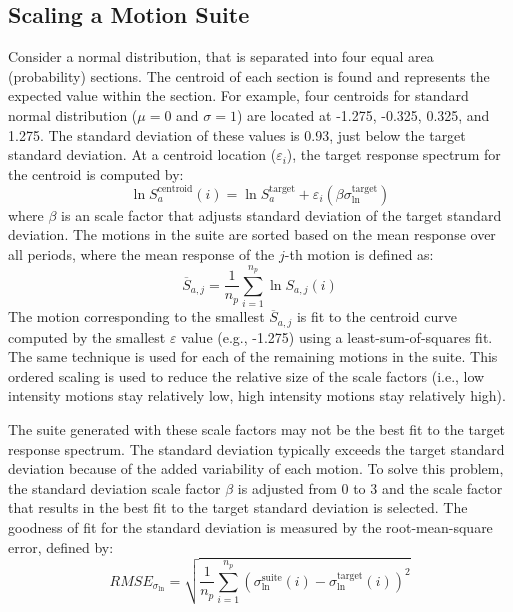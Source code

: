 \documentclass[11pt]{article}
\begin{document}
\subsection{Scaling a Motion Suite}
Consider a normal distribution, that is separated into four equal area
(probability) sections. The centroid of each section is found and represents the
expected value within the section. For example, four centroids for standard
normal distribution ($\mu=0$ and $\sigma=1$) are located at -1.275, -0.325,
0.325, and 1.275. The standard deviation of these values is 0.93, just below the
target standard deviation. At a centroid location ($\varepsilon_i$), the target
response spectrum for the centroid is computed by:
\begin{displaymath}
	\ln S_a^\text{centroid}(i) = \ln S_a^\text{target} + \varepsilon_i \left( \beta
	\sigma_{\ln}^{\text{target}} \right)
\end{displaymath}
where $\beta$ is an scale factor that adjusts standard deviation of the target
standard deviation.  The motions in the suite are sorted based on the mean
response over all periods, where the mean response of the $j$-th motion is
defined as:
\begin{displaymath}
  \overline{S}_{a,j} = \frac{1}{n_p} \sum_{i=1}^{n_p} \ln S_{a,j}(i)
\end{displaymath}
The motion corresponding to the smallest $\overline{S}_{a,j}$ is 
fit to the centroid curve computed by the smallest $\varepsilon$
value (e.g., -1.275) using a least-sum-of-squares fit. The same technique is
used for each of the remaining motions in the suite. This ordered scaling is
used to reduce the relative size of the scale factors (i.e., low intensity
motions stay relatively low, high intensity motions stay relatively high).

The suite generated with these scale factors may not be the best fit to the
target response spectrum. The standard deviation typically exceeds the target
standard deviation because of the added variability of each motion. To solve
this problem, the standard deviation scale factor $\beta$ is adjusted from 0 to
3 and the scale factor that results in the best fit to the target standard
deviation is selected. The goodness of fit for the standard deviation is
measured by the root-mean-square error, defined by:
\begin{displaymath}
	RMSE_{\sigma_{\ln}} = \sqrt{\frac{1}{n_p} \sum_{i=1}^{n_p}\left(
	\sigma_{\ln}^\text{suite}(i) - \sigma_{\ln}^\text{target}(i) \right)^2 } 
\end{displaymath}
\end{document}
